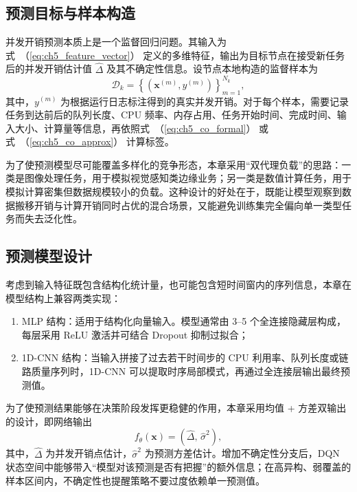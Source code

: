\subsection{预测目标与样本构造}

并发开销预测本质上是一个监督回归问题。其输入为式~（\ref{eq:ch5_feature_vector}） 定义的多维特征，输出为目标节点在接受新任务后的并发开销估计值 $\widehat{\Delta}$ 及其不确定性信息。设节点本地构造的监督样本为
\begin{equation}
    \mathcal{D}_k = \left\{ \left(\bm{x}^{(m)}, y^{(m)} \right) \right\}_{m=1}^{N_k},
\end{equation}
其中，$y^{(m)}$ 为根据运行日志标注得到的真实并发开销。对于每个样本，需要记录任务到达前后的队列长度、CPU 频率、内存占用、任务开始时间、完成时间、输入大小、计算量等信息，再依照式~（\ref{eq:ch5_co_formal}） 或式~（\ref{eq:ch5_co_approx}） 计算标签。

为了使预测模型尽可能覆盖多样化的竞争形态，本章采用“双代理负载”的思路：一类是图像处理任务，用于模拟视觉感知类边缘业务；另一类是数值计算任务，用于模拟计算密集但数据规模较小的负载。这种设计的好处在于，既能让模型观察到数据搬移开销与计算开销同时占优的混合场景，又能避免训练集完全偏向单一类型任务而失去泛化性。

\subsection{预测模型设计}

考虑到输入特征既包含结构化统计量，也可能包含短时间窗内的序列信息，本章在模型结构上兼容两类实现：

\begin{enumerate}[label=\arabic*)]
    \item {MLP 结构}：适用于结构化向量输入。模型通常由 3--5 个全连接隐藏层构成，每层采用 ReLU 激活并可结合 Dropout 抑制过拟合；
    \item {1D-CNN 结构}：当输入拼接了过去若干时间步的 CPU 利用率、队列长度或链路质量序列时，1D-CNN 可以提取时序局部模式，再通过全连接层输出最终预测值。
\end{enumerate}

为了使预测结果能够在决策阶段发挥更稳健的作用，本章采用{均值 + 方差双输出}的设计，即网络输出
\begin{equation}
    f_{\theta}(\bm{x}) = \left(\widehat{\Delta},\, \widehat{\sigma}^2 \right),
\end{equation}
其中，$\widehat{\Delta}$ 为并发开销点估计，$\widehat{\sigma}^2$ 为预测方差估计。增加不确定性分支后，DQN 状态空间中能够带入“模型对该预测是否有把握”的额外信息；在高异构、弱覆盖的样本区间内，不确定性也提醒策略不要过度依赖单一预测值。

